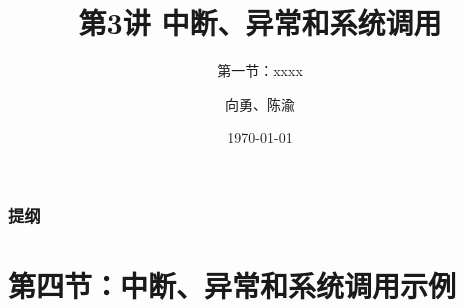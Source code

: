 


\title[第3讲]{第3讲 中断、异常和系统调用} %
\subtitle{第一节：xxxx}
\author{向勇、陈渝} %
\date{\today} %



\begin{frame}
\titlepage %
\end{frame}
\begin{frame}
\frametitle{提纲} %
\tableofcontents %
\end{frame}

\section{第四节：中断、异常和系统调用示例}%
% 
